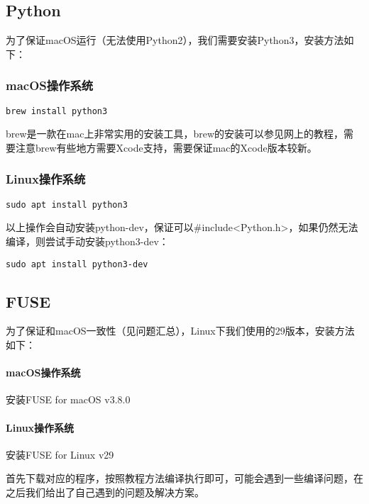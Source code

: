 \subsection{Python}

为了保证macOS运行（无法使用Python2），我们需要安装Python3，安装方法如下：

\subsubsection{macOS操作系统} 

\begin{lstlisting}
brew install python3
\end{lstlisting}

brew是一款在mac上非常实用的安装工具，brew的安装可以参见网上的教程，需要注意brew有些地方需要Xcode支持，需要保证mac的Xcode版本较新。

\subsubsection{Linux操作系统} 

\begin{lstlisting}
sudo apt install python3
\end{lstlisting}

以上操作会自动安装python-dev，保证可以\#include<Python.h>，如果仍然无法编译，则尝试手动安装python3-dev：

\begin{lstlisting}
sudo apt install python3-dev
\end{lstlisting}

\subsection{FUSE}

为了保证和macOS一致性（见问题汇总），Linux下我们使用的29版本，安装方法如下：

\paragraph{macOS操作系统} 安装FUSE for macOS v3.8.0

\paragraph{Linux操作系统} 安装FUSE for Linux v29
 
首先下载对应的程序，按照教程方法编译执行即可，可能会遇到一些编译问题，在之后我们给出了自己遇到的问题及解决方案。


